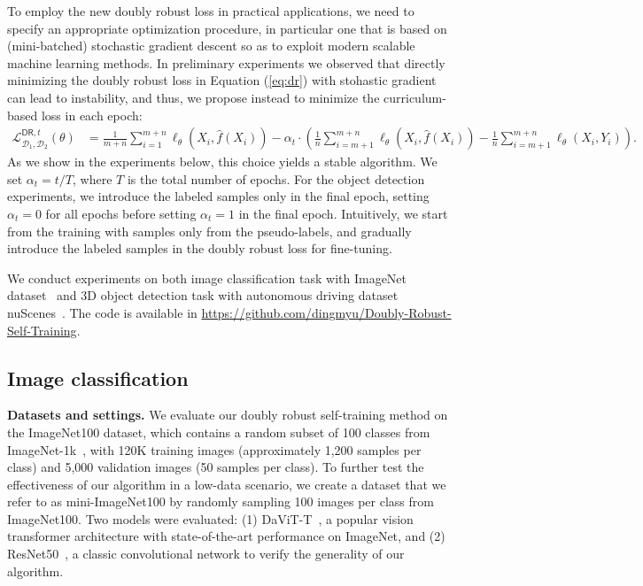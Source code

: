 To employ the new doubly robust loss in practical applications, we need to specify an appropriate optimization procedure, in particular one that is based on (mini-batched) stochastic gradient descent so as to exploit modern scalable machine learning methods.  In preliminary experiments we observed that directly minimizing the doubly robust loss in Equation (\ref{eq:dr}) with stohastic gradient can lead to instability, and thus, we propose instead to minimize the  curriculum-based loss in each epoch:
\begin{align*}
\mathcal{L}^{\mathsf{DR}, t}_{\mathcal{D}_1,\mathcal{D}_2}(\theta) 
& = \frac{1}{m+n}  \sum_{i=1}^{m+n} \ell_\theta(X_i, \hat f(X_i)) - \alpha_t\cdot \left(  \frac{1}{n} \sum_{i=m+1}^{m+n} \ell_\theta(X_i, \hat f(X_i))  - \frac{1}{n} \sum_{i=m+1}^{m+n} \ell_\theta(X_i, Y_i)\right).  %
\end{align*}
As we show in the experiments below, this choice yields a stable algorithm. We set $\alpha_t = t/T$, where $T$ is the total number of epochs. For the object detection experiments, we introduce the labeled samples only in the final epoch, setting $\alpha_t = 0$ for all epochs before setting $\alpha_t = 1$ in the final epoch. Intuitively, we start from the training with samples only from the pseudo-labels, and gradually introduce the labeled samples in the doubly robust loss for fine-tuning. 

We conduct experiments on both image classification task with ImageNet dataset~\citep{russakovsky2015imagenet} and 3D object detection task with  autonomous driving dataset nuScenes~\citep{nuscenes2019}. The code is available in \url{https://github.com/dingmyu/Doubly-Robust-Self-Training}.

\subsection{Image classification}

\textbf{Datasets and settings.}
We evaluate our doubly robust self-training method on the ImageNet100 dataset, which contains a random subset of 100 classes from ImageNet-1k~\citep{russakovsky2015imagenet}, with  120K training images (approximately 1,200 samples per class) and 5,000 validation images (50 samples per class).
%
To further test the effectiveness of our algorithm in a low-data scenario, we create a dataset that we refer to as mini-ImageNet100 by
randomly sampling 100 images per class from ImageNet100.
%
Two models were evaluated: (1) DaViT-T~\citep{ding2022davit}, a popular vision transformer architecture with state-of-the-art performance on ImageNet, and (2) ResNet50~\citep{he2016deep}, a classic convolutional network to verify the generality of our algorithm. 

